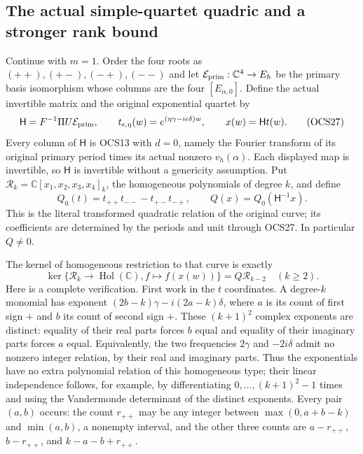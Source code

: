 \documentclass[11pt,a4paper]{article}
\begin{document}
\subsection{The actual simple-quartet quadric and a stronger rank bound}
Continue with $m=1$. Order the four roots as
$(++),(+-),(-+),(--)$ and let
$\mathcal E_{\rm prim}:\mathbb C^4\to E_h$ be the primary
basis isomorphism whose columns are the four $[E_{\alpha,0}]$.
Define the actual invertible matrix and the original exponential
quartet by
\[
 \mathsf H=F^{-1}\Pi U\mathcal E_{\rm prim},\qquad
 t_{\epsilon,\eta}(w)=e^{(\eta\gamma-i\epsilon\delta)w},
 \qquad x(w)=\mathsf Ht(w).
 \tag{OCS27}
\]
Every column of $\mathsf H$ is OCS13 with $d=0$, namely the
Fourier transform of its original primary period times its
actual nonzero $v_h(\alpha)$. Each displayed map is invertible,
so $\mathsf H$ is invertible without a genericity assumption.
Put $\mathcal R_k=\mathbb C[x_1,x_2,x_3,x_4]_k$, the homogeneous
polynomials of degree $k$, and define
\[
 Q_0(t)=t_{++}t_{--}-t_{+-}t_{-+},\qquad
 Q(x)=Q_0(\mathsf H^{-1}x).
 \tag{OCS28}
\]
This is the literal transformed quadratic relation of the
original curve; its coefficients are determined by the periods
and unit through OCS27. In particular $Q\ne0$.

The kernel of homogeneous restriction to that curve is exactly
\[
 \ker\{\mathcal R_k\to\operatorname{Hol}(\mathbb C),
                         f\mapsto f(x(w))\}
            =Q\mathcal R_{k-2}\quad(k\geq2).
 \tag{OCS29}
\]
Here is a complete verification. First work in the $t$ coordinates.
A degree-$k$ monomial has exponent
$(2b-k)\gamma-i(2a-k)\delta$, where $a$ is its count of
first sign $+$ and $b$ its count of second sign $+$.
These $(k+1)^2$ complex exponents are distinct: equality of
their real parts forces $b$ equal and equality of their
imaginary parts forces $a$ equal. Equivalently, the two
frequencies $2\gamma$ and $-2i\delta$ admit no nonzero
integer relation, by their real and imaginary parts. Thus
the exponentials have no extra polynomial relation of this
homogeneous type; their linear independence follows, for
example, by differentiating $0,\ldots,(k+1)^2-1$ times and
using the Vandermonde determinant of the distinct exponents.
Every pair $(a,b)$ occurs: the count $r_{++}$ may be any integer
between $\max(0,a+b-k)$ and $\min(a,b)$, a nonempty interval,
and the other three counts are $a-r_{++}$, $b-r_{++}$,
and $k-a-b+r_{++}$.
\end{document}
